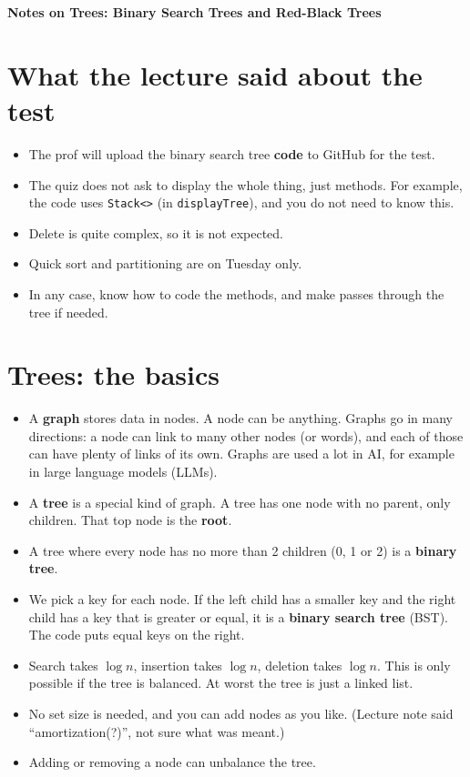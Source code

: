 \documentclass[11pt]{article}
\begin{document}
	
	\begin{center}
		{\Large \textbf{Notes on Trees: Binary Search Trees and Red-Black Trees}}
	\end{center}
	
	\section{What the lecture said about the test}
	\begin{itemize}
		\item The prof will upload the binary search tree \textbf{code} to GitHub for the test.
		\item The quiz does not ask to display the whole thing, just methods. For example, the code uses \texttt{Stack<>} (in \texttt{displayTree}), and you do not need to know this.
		\item Delete is quite complex, so it is not expected.
		\item Quick sort and partitioning are on Tuesday only.
		\item In any case, know how to code the methods, and make passes through the tree if needed.
	\end{itemize}
	
	\section{Trees: the basics}
	\begin{itemize}
		\item A \textbf{graph} stores data in nodes. A node can be anything. Graphs go in many directions: a node can link to many other nodes (or words), and each of those can have plenty of links of its own. Graphs are used a lot in AI, for example in large language models (LLMs).
		\item A \textbf{tree} is a special kind of graph. A tree has one node with no parent, only children. That top node is the \textbf{root}.
		\item A tree where every node has no more than 2 children (0, 1 or 2) is a \textbf{binary tree}.
		\item We pick a key for each node. If the left child has a smaller key and the right child has a key that is greater or equal, it is a \textbf{binary search tree} (BST). The code puts equal keys on the right.
		\item Search takes $\log n$, insertion takes $\log n$, deletion takes $\log n$. This is only possible if the tree is balanced. At worst the tree is just a linked list.
		\item No set size is needed, and you can add nodes as you like. (Lecture note said ``amortization(?)'', not sure what was meant.)
		\item Adding or removing a node can unbalance the tree.
	\end{itemize}
	
\end{document}
